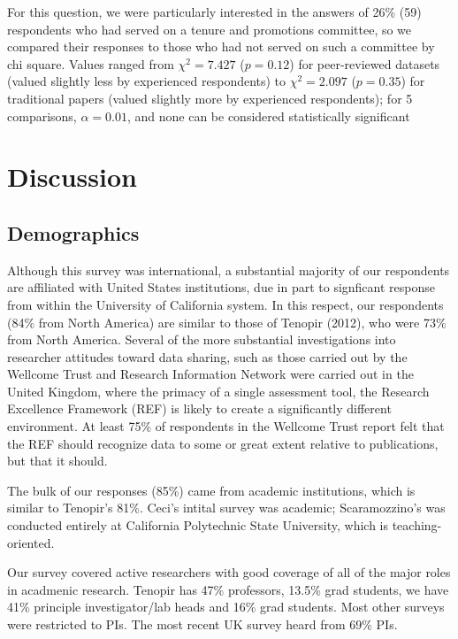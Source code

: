 \documentclass[10pt]{article}
\begin{document}
For this question, we were particularly interested in the answers of 26\% (59) respondents who had served on a tenure and promotions committee, so we compared their responses to those who had not served on such a committee by chi square.
Values ranged from $\chi^{2}= 7.427$ ($p= 0.12$) for peer-reviewed datasets (valued slightly less by experienced respondents) to $\chi^{2}= 2.097$ ($p= 0.35$) for traditional papers (valued slightly more by experienced respondents); for 5 comparisons, $\alpha=0.01$, and none can be considered statistically significant


\section*{Discussion}

\subsection*{Demographics}

Although this survey was international, a substantial majority of our respondents are affiliated with United States institutions, due in part to signficant response from within the University of California system.
In this respect, our respondents (84\% from North America) are similar to those of Tenopir (2012), who were 73\% from North America.
Several of the more substantial investigations into researcher attitudes toward data sharing, such as those carried out by the Wellcome Trust\cite{bobrow_establishing_2014} and Research Information Network\cite{swan_share_2008} were carried out in the United Kingdom, where the primacy of a single assessment tool, the Research Excellence Framework (REF) is likely to create a significantly different environment.
At least 75\% of respondents in the Wellcome Trust report felt that the REF should recognize data to some or great extent relative to publications, but that it should.

The bulk of our responses (85\%) came from academic institutions, which is similar to Tenopir's 81\%.  
Ceci's intital survey was academic\cite{ceci_scientists_1988}; Scaramozzino's was conducted entirely at California Polytechnic State University, which is teaching-oriented\cite{scaramozzino_study_2012}. 

Our survey covered active researchers with good coverage of all of the major roles in acadmenic research.
Tenopir has 47\% professors, 13.5\% grad students, we have 41\% principle investigator/lab heads and 16\% grad students.
Most other surveys were restricted to PIs.
The most recent UK survey heard from 69\% PIs\cite{bobrow_establishing_2014}.
\end{document}
